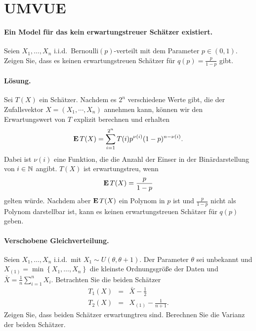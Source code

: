 \section{UMVUE}

\paragraph{Ein Model für das kein erwartungstreuer Schätzer existiert.}
Seien $X_1,\ldots,X_n$ i.i.d.\ Bernoulli$(p)$-verteilt mit dem Parameter $p \in
(0,1)$.  Zeigen Sie, dass es keinen erwartungstreuen Schätzer für $q(p) =
\frac{p}{1-p}$ gibt. 

\paragraph*{Lösung.} Sei $T(X)$ ein Schätzer. Nachdem es $2^n$ verschiedene
Werte gibt, die der Zufallsvektor $X = (X_1, \cdots, X_n)$ annehmen kann, können 
wir den Erwartungswert von $T$ explizit berechnen und erhalten
\begin{equation*}
    \mathbf{E} \, T(X) = \sum_{i = 1}^{2^n} T(i) p^{\nu(i)}(1-p)^{n - \nu(i)}.
\end{equation*}
Dabei ist $\nu(i)$ eine Funktion, die die Anzahl der Einser in der
Binärdarstellung von $i\in \mathbb N$ angibt. $T(X)$ ist erwartungstreu, wenn 
\begin{equation*}
    \mathbf{E} \, T(X) = \frac{p}{1-p}
\end{equation*}
gelten würde. Nachdem aber $\mathbf{E}\, T(X)$ ein Polynom in $p$ ist und $\frac{p}{1-p}$ nicht
als Polynom darstellbar ist, kann es keinen erwartungstreuen Schätzer für $q(p)$ geben. 


\paragraph{Verschobene Gleichverteilung. } 
Seien $X_1,\ldots,X_n$ i.i.d.\ mit $X_1\sim U(\theta,\theta+1)$. Der Parameter
$\theta$ sei  unbekannt und $X_{(1)}=\min\left\{ X_1,\ldots,X_n \right\}$ die
kleinste Ordnungsgröße der Daten und $\bar X= \frac{1}{n}\sum_{i=1}^{n}X_i$.
Betrachten Sie die beiden Schätzer 
\begin{eqnarray}
	T_1(X) &=& \bar X - \frac{1}{2} \\
	T_2(X) &=&  X_{(1)} - \frac{1}{n+1}.
\end{eqnarray}
Zeigen Sie, dass beiden Schätzer erwartungtreu sind. Berechnen Sie 
die Varianz der beiden Schätzer.

